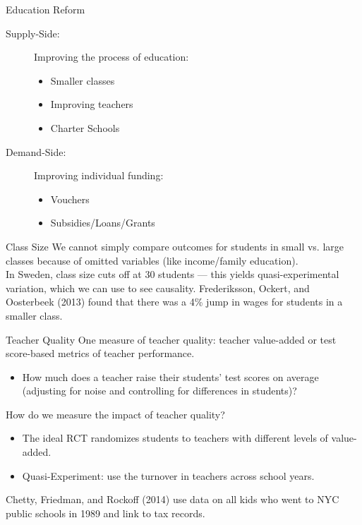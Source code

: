 \documentclass[10pt]{extarticle}
\begin{document}
  \begin{problem}{Education Reform}
    \begin{description}
      \item[Supply-Side:] Improving the process of education:
        \begin{itemize}
          \item Smaller classes
          \item Improving teachers
          \item Charter Schools
        \end{itemize}
      \item[Demand-Side:] Improving individual funding:
        \begin{itemize}
          \item Vouchers
          \item Subsidies/Loans/Grants
        \end{itemize}
    \end{description}
    \begin{problem}{Class Size}
      We cannot simply compare outcomes for students in small vs. large classes because of omitted variables (like income/family education).\\

      In Sweden, class size cuts off at 30 students --- this yields quasi-experimental variation, which we can use to see causality. Frederiksson, Ockert, and Oosterbeek (2013) found that there was a 4\% jump in wages for students in a smaller class.
    \end{problem}
    \begin{problem}{Teacher Quality}
      One measure of teacher quality: teacher value-added or test score-based metrics of teacher performance.
      \begin{itemize}
        \item How much does a teacher raise their students' test scores on average (adjusting for noise and controlling for differences in students)?
      \end{itemize}
      How do we measure the impact of teacher quality?
      \begin{itemize}
        \item The ideal RCT randomizes students to teachers with different levels of value-added.
        \item Quasi-Experiment: use the turnover in teachers across school years.
      \end{itemize}
      Chetty, Friedman, and Rockoff (2014) use data on all kids who went to NYC public schools in 1989 and link to tax records.\\


\end{problem}
\end{problem}
\end{document}
